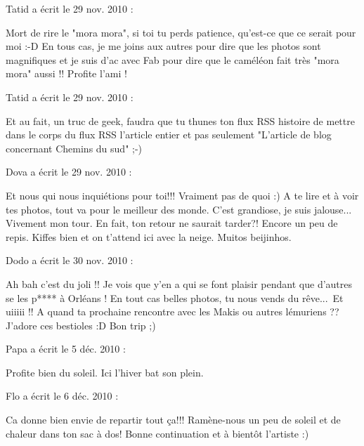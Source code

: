 \medskip
Tatid a écrit le 29 nov. 2010 :
\begin{displayquote}
Mort de rire le "mora mora", si toi tu perds patience, qu'est-ce que ce serait pour moi :-D
En tous cas, je me joins aux autres pour dire que les photos sont magnifiques et je suis d'ac avec Fab pour dire que le caméléon fait très "mora mora" aussi !!
Profite l'ami !
\end{displayquote}

\medskip
Tatid a écrit le 29 nov. 2010 :
\begin{displayquote}
Et au fait, un truc de geek, faudra que tu thunes ton flux RSS histoire de mettre dans le corps du flux RSS l'article entier et pas seulement "L'article de blog concernant Chemins du sud" ;-)
\end{displayquote}

\medskip
Dova a écrit le 29 nov. 2010 :
\begin{displayquote}
Et nous qui nous inquiétions pour toi!!!
Vraiment pas de quoi :)
A te lire et à voir tes photos, tout va pour le meilleur des monde.
C'est grandiose, je suis jalouse... Vivement mon tour.
En fait, ton retour ne saurait tarder?! Encore un peu de repis. Kiffes bien et on t'attend ici avec la neige.
Muitos beijinhos.
\end{displayquote}

\medskip
Dodo a écrit le 30 nov. 2010 :
\begin{displayquote}
Ah bah c'est du joli !! Je vois que y'en a qui se font plaisir pendant que d'autres se les p**** à Orléans !
En tout cas belles photos, tu nous vends du rêve... Et uiiiii !! A quand ta prochaine rencontre avec les Makis ou autres lémuriens ?? J'adore ces bestioles :D
Bon trip ;)
\end{displayquote}

\medskip
Papa a écrit le 5 déc. 2010 :
\begin{displayquote}
Profite bien du soleil. Ici l'hiver bat son plein.
\end{displayquote}

\medskip
Flo a écrit le 6 déc. 2010 :
\begin{displayquote}
Ca donne bien envie de repartir tout ça!!!
Ramène-nous un peu de soleil et de chaleur dans ton sac à dos!
Bonne continuation et à bientôt l'artiste :)
\end{displayquote}

\vfill
